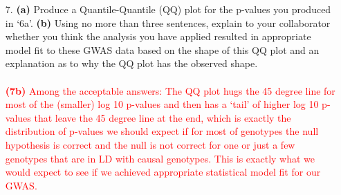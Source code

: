\documentclass[letterpaper, 11pt]{article}
\begin{document}
\begin{itemize}
\item[7.]  \textbf{(a)} Produce a Quantile-Quantile (QQ) plot for the p-values you produced in `6a'.  \textbf{(b)} Using no more than three sentences, explain to your collaborator whether you think the analysis you have applied resulted in appropriate model fit to these GWAS data based on the shape of this QQ plot and an explanation as to why the QQ plot has the observed shape.
\\
\\
\textcolor{red}{ 
\textbf{(7b)} Among the acceptable answers: The QQ plot hugs the 45 degree line for most of the (smaller) log 10 p-values and then has a `tail' of higher log 10 p-values that leave the 45 degree line at the end, which is exactly the distribution of p-values we should expect if for most of genotypes the null hypothesis is correct and the null is not correct for one or just a few genotypes that are in LD with causal genotypes.  This is exactly what we would expect to see if we achieved appropriate statistical model fit for our GWAS.
} 


\end{itemize}
\end{document}
